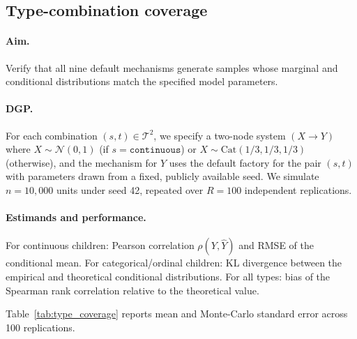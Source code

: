 \documentclass[article]{jss}
\begin{document}
\subsection{Type-combination coverage}
\label{sec:sim_types}

\paragraph{Aim.}
Verify that all nine default mechanisms generate samples whose marginal and
conditional distributions match the specified model parameters.

\paragraph{DGP.}
For each combination $(s,t) \in \mathcal{T}^2$, we specify a two-node system
$(X\to Y)$ where $X\sim\mathcal{N}(0,1)$ (if $s=\mathtt{continuous}$) or
$X\sim\mathrm{Cat}(1/3,1/3,1/3)$ (otherwise), and the mechanism for $Y$ uses
the default factory for the pair $(s,t)$ with parameters drawn from a fixed,
publicly available seed. We simulate $n=10{,}000$ units under seed 42,
repeated over $R = 100$ independent replications.

\paragraph{Estimands and performance.}
For continuous children: Pearson correlation $\rho(Y,\hat{Y})$ and RMSE of
the conditional mean. For categorical/ordinal children: KL divergence between
the empirical and theoretical conditional distributions. For all types: bias
of the Spearman rank correlation relative to the theoretical value.

Table~\ref{tab:type_coverage} reports mean and Monte-Carlo standard error
across 100 replications.
\end{document}
